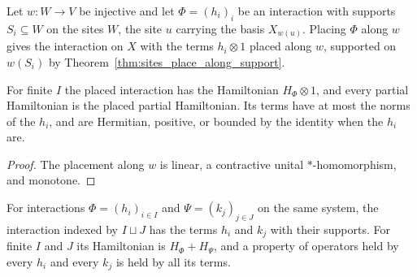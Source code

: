 \begin{definition}
    \label{def:dynamics_interaction_pushforward}
    \leanok
    Let $w\colon W\to V$ be injective and let $\Phi=(h_i)_i$ be an interaction with supports
    $S_i\subseteq W$ on the sites $W$, the site $u$ carrying the basis $X_{w(u)}$. Placing
    $\Phi$ along $w$ gives the interaction on $X$ with the terms $h_i\otimes1$ placed along
    $w$, supported on $w(S_i)$ by Theorem~\ref{thm:sites_place_along_support}.
\end{definition}

\begin{lemma}
    \label{lem:dynamics_interaction_pushforward}
    \leanok
    For finite $I$ the placed interaction has the Hamiltonian $H_\Phi\otimes1$, and every
    partial Hamiltonian is the placed partial Hamiltonian. Its terms have at most the norms
    of the $h_i$, and are Hermitian, positive, or bounded by the identity when the $h_i$ are.
\end{lemma}
\begin{proof}\leanok
    The placement along $w$ is linear, a contractive unital $*$-homomorphism, and
    monotone.
\end{proof}

\begin{definition}
    \label{def:dynamics_interaction_append}
    \leanok
    For interactions $\Phi=(h_i)_{i\in I}$ and $\Psi=(k_j)_{j\in J}$ on the same system, the
    interaction indexed by $I\sqcup J$ has the terms $h_i$ and $k_j$ with their supports. For
    finite $I$ and $J$ its Hamiltonian is $H_\Phi+H_\Psi$, and a property of operators held
    by every $h_i$ and every $k_j$ is held by all its terms.
\end{definition}

